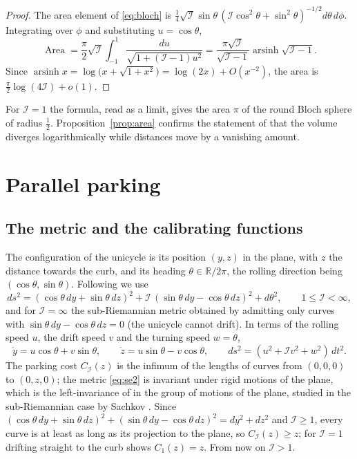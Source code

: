\documentclass[11pt]{amsart}
\theoremstyle{definition}
\newcommand{\RR}{\mathbb{R}}
\newcommand{\I}{\mathcal{I}}
\DeclareMathOperator{\arsinh}{arsinh}
\DeclareMathOperator{\Area}{Area}
\begin{document}
\begin{proof}
The area element of \eqref{eq:bloch} is $\tfrac14\sqrt{\I}\sin\theta\,(\I\cos^2\theta+\sin^2\theta)^{-1/2}d\theta\,d\phi$. Integrating over $\phi$ and substituting $u=\cos\theta$,
\[
\Area=\frac{\pi}{2}\sqrt{\I}\int_{-1}^{1}\frac{du}{\sqrt{1+(\I-1)u^2}}=\frac{\pi\sqrt{\I}}{\sqrt{\I-1}}\arsinh\sqrt{\I-1}.
\]
Since $\arsinh x=\log\bigl(x+\sqrt{1+x^2}\bigr)=\log(2x)+O(x^{-2})$, the area is $\tfrac{\pi}{2}\log(4\I)+o(1)$.
\end{proof}

For $\I=1$ the formula, read as a limit, gives the area $\pi$ of the round Bloch sphere of radius $\tfrac12$. Proposition~\ref{prop:area} confirms the statement of \cite[Supplementary Information~3]{BFLS23} that the volume diverges logarithmically while distances move by a vanishing amount.

\section{Parallel parking}\label{sec:parking}

\subsection{The metric and the calibrating functions}

The configuration of the unicycle is its position $(y,z)$ in the plane, with $z$ the distance towards the curb, and its heading $\theta\in\RR/2\pi$, the rolling direction being $(\cos\theta,\sin\theta)$. Following \cite{BFLS23} we use
\begin{equation}\label{eq:se2}
ds^2=(\cos\theta\,dy+\sin\theta\,dz)^2+\I\,(\sin\theta\,dy-\cos\theta\,dz)^2+d\theta^2,\qquad 1\le\I<\infty,
\end{equation}
and for $\I=\infty$ the sub-Riemannian metric obtained by admitting only curves with $\sin\theta\,dy-\cos\theta\,dz=0$ (the unicycle cannot drift). In terms of the rolling speed $u$, the drift speed $v$ and the turning speed $w=\dot\theta$,
\[
\dot y=u\cos\theta+v\sin\theta,\qquad \dot z=u\sin\theta-v\cos\theta,\qquad ds^2=(u^2+\I v^2+w^2)\,dt^2 .
\]
The parking cost $C_\I(z)$ is the infimum of the lengths of curves from $(0,0,0)$ to $(0,z,0)$; the metric \eqref{eq:se2} is invariant under rigid motions of the plane, which is the left-invariance of \cite{BFLS23} in the group of motions of the plane, studied in the sub-Riemannian case by Sachkov \cite{Sac11}. Since $(\cos\theta\,dy+\sin\theta\,dz)^2+(\sin\theta\,dy-\cos\theta\,dz)^2=dy^2+dz^2$ and $\I\ge1$, every curve is at least as long as its projection to the plane, so $C_\I(z)\ge z$; for $\I=1$ drifting straight to the curb shows $C_1(z)=z$. From now on $\I>1$.
\end{document}

